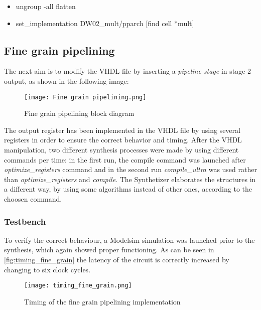 \begin{itemize}
\item ungroup -all flatten
\item set\_implementation DW02\_mult/pparch [find cell *mult]
\end{itemize}

\newpage
\subsection{Fine grain pipelining}
The next aim is to modify the VHDL file by inserting a \textit{pipeline stage} in stage 2 output, as shown in the following image:

\begin{figure}[H]
	\center
	\texttt{[image: Fine grain pipelining.png]}
	\caption{Fine grain pipelining block diagram}
	\label{fig:fine_pipe}
\end{figure}

\noindent The output register has been implemented in the VHDL file by using several registers in order to ensure the correct behavior and timing.  After the VHDL manipulation, two different synthesis processes were made by using different commands per time: in the first run, the compile command was launched after \textit{optimize\_registers} command and in the second run  \textit{compile\_ultra} was used rather than \textit{optimize\_registers} and \textit{compile}. The Synthetizer elaborates the structures in a different way, by using some algorithms instead of other ones, according to the choosen command. %

\subsubsection{Testbench}
To verify the correct behaviour, a Modelsim simulation was launched prior to the synthesis, which again showed proper functioning. As can be seen in \autoref{fig:timing_fine_grain} the latency of the circuit is correctly increased by changing to six clock cycles.

\begin{figure}[h]
	\center
	\texttt{[image: timing\_fine\_grain.png]}
	\caption{Timing of the fine grain pipelining implementation}
	\label{fig:timing_fine_grain}
\end{figure}


